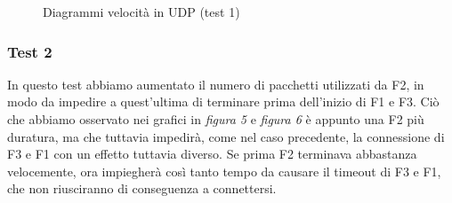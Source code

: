 \documentclass[12pt]{article}
\begin{document}
\begin{figure}[H]
	\noindent{}
	\caption{Diagrammi velocità in UDP (test 1)}
\end{figure}

\subsubsection{Test 2}
In questo test abbiamo aumentato il numero di pacchetti utilizzati da F2, in modo da impedire a quest'ultima di terminare prima dell'inizio di F1 e F3.
Ciò che abbiamo osservato nei grafici in \textit{figura 5} e \textit{figura 6} è appunto una F2 più duratura, ma che tuttavia impedirà, come nel caso precedente, la connessione di F3 e F1 con un effetto tuttavia diverso. Se prima F2 terminava abbastanza velocemente, ora impiegherà così tanto tempo da causare il timeout di F3 e F1, che non riusciranno di conseguenza a connettersi.
\end{document}
